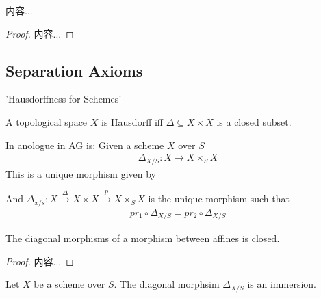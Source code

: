 \documentclass[Total.tex]{subfiles}
\begin{document}
				\begin{lemma}
					内容...
				\end{lemma}
				
				\begin{proof}
					内容...
				\end{proof}
			
			
			\subsection{Separation Axioms}
			
			'Hausdorffness for Schemes'
			
			\begin{Def}
				A topological space $X$ is Hausdorff iff $\Delta\subseteq X\times X$ is a closed subset.
				
				In anologue in AG is: Given a scheme $X$ over $S$
				\begin{gather*}
					\Delta_{X/S}:X\rightarrow X\times_S X
				\end{gather*}
				This is a unique morphism given by
				\begin{center}
				\end{center}
				And $\Delta_{x/s}:X\stackrel{\Delta}{\rightarrow} X\times X\stackrel{p}{\rightarrow} X\times_S X$ is the unique morphism such that
				\begin{gather*}
					pr_1\circ \Delta_{X/S}=pr_2\circ \Delta_{X/S}
				\end{gather*}
			\end{Def}
			
			\begin{lemma}
				The diagonal morphisms of a morphism between affines is closed.
			\end{lemma}
			
			\begin{proof}
				内容...
			\end{proof}
			
			\begin{lemma}
				Let $X$ be a scheme over $S$. The diagonal morphsim $\Delta_{X/S}$ is an immersion.
			\end{lemma}
			
\end{document}
